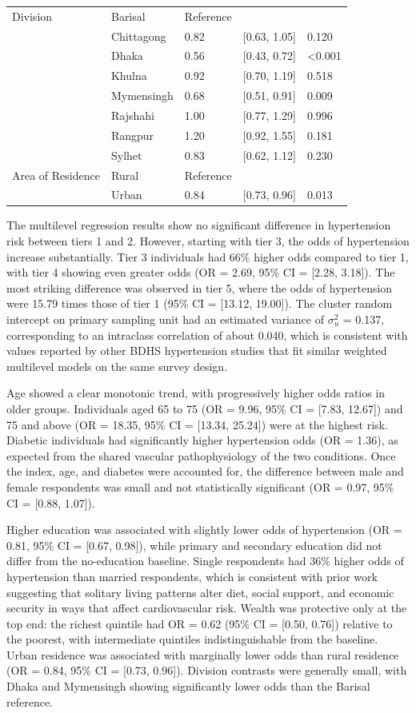 \documentclass[
  12pt,
  a4paper]{article}
\begin{document}
\begin{longtable}[t]{lllll}
Division & Barisal & Reference &  & \\
 & Chittagong & 0.82 & {}[0.63, 1.05] & 0.120\\
 & Dhaka & 0.56 & {}[0.43, 0.72] & <0.001\\
 & Khulna & 0.92 & {}[0.70, 1.19] & 0.518\\
 & Mymensingh & 0.68 & {}[0.51, 0.91] & 0.009\\
 & Rajshahi & 1.00 & {}[0.77, 1.29] & 0.996\\
 & Rangpur & 1.20 & {}[0.92, 1.55] & 0.181\\
 & Sylhet & 0.83 & {}[0.62, 1.12] & 0.230\\
Area of Residence & Rural & Reference &  & \\
 & Urban & 0.84 & {}[0.73, 0.96] & 0.013\\
\bottomrule
\end{longtable}

The multilevel regression results show no significant difference in hypertension risk between tiers 1 and 2. However, starting with tier 3, the odds of hypertension increase substantially. Tier 3 individuals had 66\% higher odds compared to tier 1, with tier 4 showing even greater odds (OR = 2.69, 95\% CI = {[}2.28, 3.18{]}). The most striking difference was observed in tier 5, where the odds of hypertension were 15.79 times those of tier 1 (95\% CI = {[}13.12, 19.00{]}). The cluster random intercept on primary sampling unit had an estimated variance of \(\sigma^2_u\) = 0.137, corresponding to an intraclass correlation of about 0.040, which is consistent with values reported by other BDHS hypertension studies that fit similar weighted multilevel models on the same survey design.

Age showed a clear monotonic trend, with progressively higher odds ratios in older groups. Individuals aged 65 to 75 (OR = 9.96, 95\% CI = {[}7.83, 12.67{]}) and 75 and above (OR = 18.35, 95\% CI = {[}13.34, 25.24{]}) were at the highest risk. Diabetic individuals had significantly higher hypertension odds (OR = 1.36), as expected from the shared vascular pathophysiology of the two conditions. Once the index, age, and diabetes were accounted for, the difference between male and female respondents was small and not statistically significant (OR = 0.97, 95\% CI = {[}0.88, 1.07{]}).

Higher education was associated with slightly lower odds of hypertension (OR = 0.81, 95\% CI = {[}0.67, 0.98{]}), while primary and secondary education did not differ from the no-education baseline. Single respondents had 36\% higher odds of hypertension than married respondents, which is consistent with prior work suggesting that solitary living patterns alter diet, social support, and economic security in ways that affect cardiovascular risk. Wealth was protective only at the top end: the richest quintile had OR = 0.62 (95\% CI = {[}0.50, 0.76{]}) relative to the poorest, with intermediate quintiles indistinguishable from the baseline. Urban residence was associated with marginally lower odds than rural residence (OR = 0.84, 95\% CI = {[}0.73, 0.96{]}). Division contrasts were generally small, with Dhaka and Mymensingh showing significantly lower odds than the Barisal reference.
\end{document}
